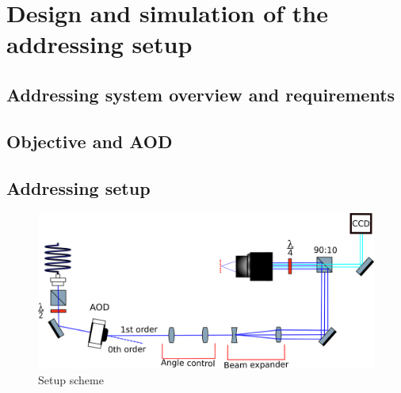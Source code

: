 \documentclass[english, a4paper, 12pt, twoside]{book}
\numberwithin{equation}{section} %
\begin{document}




\chapter{Design and simulation of the addressing setup}
\section{Addressing system overview and requirements}
\section{Objective and AOD}
\section{Addressing setup}

\begin{figure}[H]
\centering
\includegraphics[width=\textwidth]{img/setup}
\caption{Setup scheme}
\end{figure}
\end{document}
